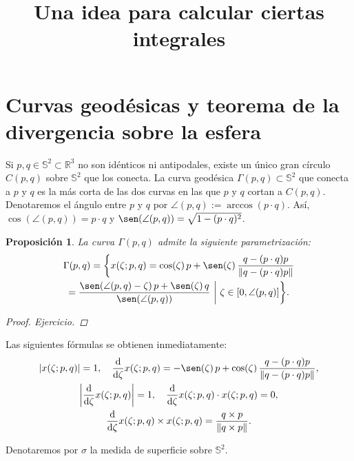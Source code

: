 \documentclass[reqno]{amsart}
\newcommand{\norm}[2][y]{\if#1y\left\fi\lVert#2\if#1y\right\fi\rVert} %
\newcommand{\abs}[2][y]{\if#1y\left\fi\lvert#2\if#1y\right\fi\rvert} %
\newtheorem{proposition}[thm]{Proposición}
\begin{document}
\title{Una idea para calcular ciertas integrales}
\maketitle

\section{Curvas geodésicas y teorema de la divergencia sobre la esfera}

Si $p, q \in \mathbb{S}^2 \subset \mathbb{R}^3$ no son idénticos ni antipodales, existe un único gran círculo $C(p,q)$ sobre $\mathbb{S}^2$ que los conecta.
La curva geodésica $\Gamma(p,q) \subset \mathbb{S}^2$ que conecta a $p$ y $q$ es la más corta de las dos curvas en las que $p$ y $q$ cortan a $C(p,q)$.
Denotaremos el ángulo entre $p$ y $ q$ por $\angle(p,q) := \arccos(p\cdot q)$.
Así, $\cos(\angle(p,q)) = p\cdot q$ y $\sen(\angle(p,q)) = \sqrt{1-(p\cdot q)^2}$.

\begin{proposition}\label{pro:param} La curva $\Gamma(p,q)$ admite la siguiente parametrización:
%
\begin{multline*}
\Gamma(p,q) = \bigg\{ x(\zeta;p,q) = \cos(\zeta) \, p + \sen(\zeta) \, \frac{q - (p\cdot q)p}{\norm{q - (p\cdot q)p}}\\ = \frac{\sen(\angle(p,q) - \zeta) \, p + \sen(\zeta) \, q}{\sen(\angle(p,q))} \ \bigg| \ \zeta \in [0, \angle(p,q)] \bigg\}.
\end{multline*}
%
\begin{proof} Ejercicio.
\end{proof}
\end{proposition}
%
Las siguientes fórmulas se obtienen inmediatamente:
%
\begin{equation}\label{param-aux}
\begin{gathered}
\abs{x(\zeta;p,q)} = 1, \quad
\frac{\mathrm{d}}{\mathrm{d}\zeta} x(\zeta;p,q) = -\sen(\zeta) \, p + \cos(\zeta) \, \frac{q - (p\cdot q)p}{\norm{q - (p\cdot q)p}},\\
\abs{\frac{\mathrm{d}}{\mathrm{d}\zeta} x(\zeta;p,q)} = 1, \quad
\frac{\mathrm{d}}{\mathrm{d}\zeta} x(\zeta;p,q) \cdot x(\zeta;p,q) = 0,\\
\frac{\mathrm{d}}{\mathrm{d}\zeta} x(\zeta;p,q) \times x(\zeta;p,q) = \frac{q \times p}{\norm{q \times p}}.
\end{gathered}
\end{equation}

Denotaremos por $\sigma$ la medida de superficie sobre $\mathbb{S}^2$.
\end{document}
